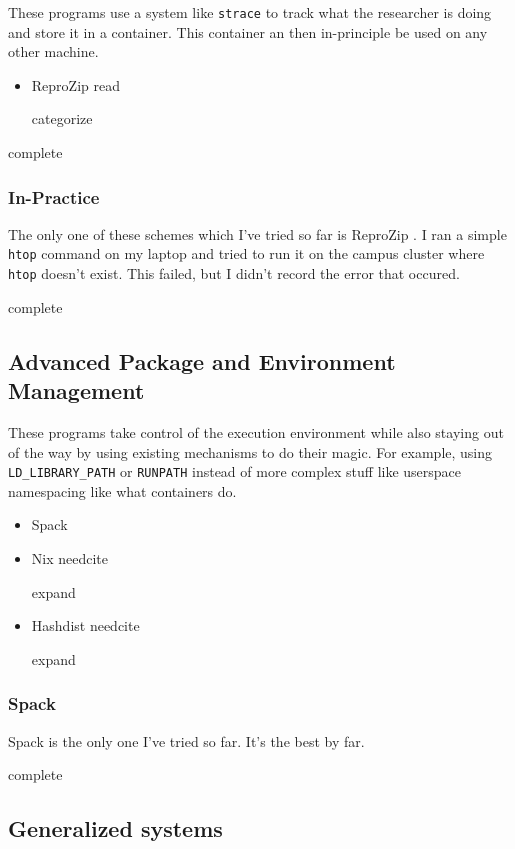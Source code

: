 \documentclass{article}
\newcommand{\Read}{
	\gls{read}
}
\newcommand{\categorize}{
	\gls{categorize}
}
\newcommand{\complete}{
	\gls{complete}
}
\newcommand{\needcite}{
	\gls{needcite}
}
\newcommand{\expand}{
	\gls{expand}
}
\begin{document}
These programs use a system like \texttt{strace} to track what the researcher is doing and store it in a container. This container an then in-principle be used on any other machine.

\begin{itemize}
\item ReproZip \cite{reprozip} \Read \categorize
\end{itemize}

\complete

\subsubsection{In-Practice}

The only one of these schemes which I've tried so far is ReproZip \cite{reprozip}. I ran a simple \texttt{htop} command on my laptop and tried to run it on the campus cluster where \texttt{htop} doesn't exist. This failed, but I didn't record the error that occured.

\complete

\subsection{Advanced Package and Environment Management}

These programs take control of the execution environment while also staying out of the way by using existing mechanisms to do their magic. For example, using \texttt{LD\_LIBRARY\_PATH} or \texttt{RUNPATH} instead of more complex stuff like userspace namespacing like what containers do.

\begin{itemize}
\item Spack \cite{Spack}
\item Nix \needcite \expand
\item Hashdist \needcite \expand
\end{itemize}

\subsubsection{Spack}

Spack \cite{Spack} is the only one I've tried so far. It's the best by far.

\complete

\subsection{Generalized systems}
\end{document}
